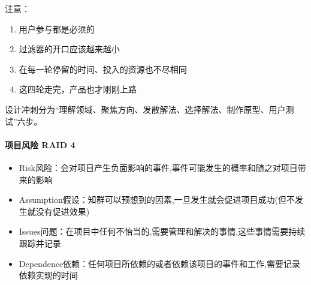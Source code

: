 \documentclass[letterpaper,11pt,english]{sphinxmanual}
\begin{document}
注意：
\begin{enumerate}
%
\item {} 
用户参与都是必须的

\item {} 
过滤器的开口应该越来越小

\item {} 
在每一轮停留的时间、投入的资源也不尽相同

\item {} 
这四轮走完，产品也才刚刚上路

\end{enumerate}

设计冲刺分为“理解领域、聚焦方向、发散解法、选择解法、制作原型、用户测试”六步。


\paragraph{项目风险 RAID 4\sphinxfootnotemark[416]}
\label{\detokenize{chapter_knowledge/BRD:raid-4}}%
\begin{footnotetext}[416]\sphinxAtStartFootnote
{}
%
\end{footnotetext}\ignorespaces \begin{itemize}
\item {} 
Risk风险：会对项目产生负面影响的事件,事件可能发生的概率和随之对项目带来的影响

\item {} 
Assumption假设：知群可以预想到的因素,一旦发生就会促进项目成功(但不发生就没有促进效果)

\item {} 
Issues问题：在项目中任何不怡当的,需要管理和解决的事情,这些事情需要持续跟踪并记录

\item {} 
Dependence依赖：任何项目所依赖的或者依赖该项目的事件和工作,需要记录依赖实现的时间

\end{itemize}
\end{document}
